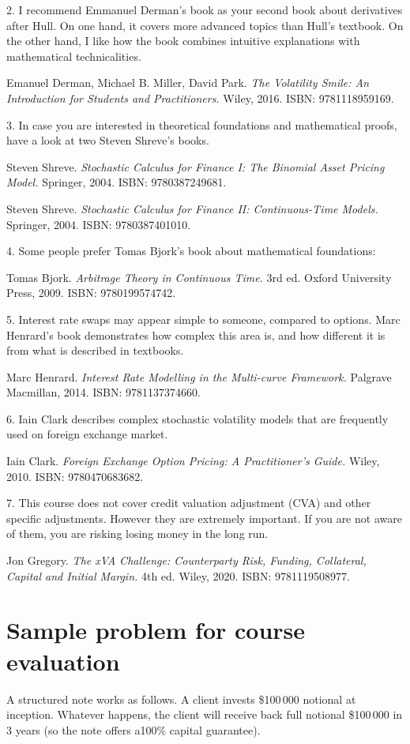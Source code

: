 \documentclass[a4paper,14pt]{extarticle}
\begin{document}
2. I recommend Emmanuel Derman’s book as your second book about derivatives after Hull. On
one hand, it covers more advanced topics than Hull’s textbook. On the other hand, I like how the
book combines intuitive explanations with mathematical technicalities.

Emanuel Derman, Michael B. Miller, David Park. \textit{The Volatility Smile: An Introduction for Students
and Practitioners.} Wiley, 2016. ISBN: 9781118959169.

3. In case you are interested in theoretical foundations and mathematical proofs, have a look at
two Steven Shreve’s books.

Steven Shreve. \textit{Stochastic Calculus for Finance I: The Binomial Asset Pricing Model.} Springer, 2004.
ISBN: 9780387249681.

Steven Shreve. \textit{Stochastic Calculus for Finance II: Continuous-Time Models.} Springer, 2004. ISBN:
9780387401010.

4. Some people prefer Tomas Bjork’s book about mathematical foundations:

Tomas Bjork. \textit{Arbitrage Theory in Continuous Time.} 3rd ed. Oxford University Press, 2009. ISBN:
9780199574742.

5. Interest rate swaps may appear simple to someone, compared to options. Marc Henrard’s
book demonstrates how complex this area is, and how different it is from what is described in
textbooks.

Marc Henrard. \textit{Interest Rate Modelling in the Multi-curve Framework.} Palgrave Macmillan, 2014.
ISBN: 9781137374660.

6. Iain Clark describes complex stochastic volatility models that are frequently used on foreign
exchange market.

Iain Clark. \textit{Foreign Exchange Option Pricing: A Practitioner's Guide.} Wiley, 2010. ISBN: 9780470683682.

7. This course does not cover credit valuation adjustment (CVA) and other specific adjustments.
However they are extremely important. If you are not aware of them, you are risking losing
money in the long run.

Jon Gregory. \textit{The xVA Challenge: Counterparty Risk, Funding, Collateral, Capital and Initial Margin.}
4th ed. Wiley, 2020. ISBN: 9781119508977.

\section*{Sample problem for course evaluation}
A structured note works as follows. A client invests \$100\,000 notional at inception. Whatever
happens, the client will receive back full notional \$100\,000 in 3 years (so the note offers a100\% capital
guarantee).
\end{document}
